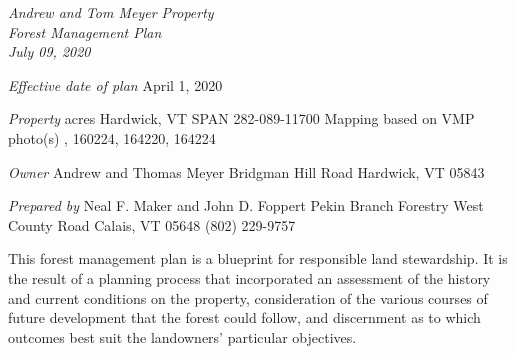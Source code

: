 \documentclass[]{tufte-handout}
\date{}
\begin{document}
\thispagestyle{empty}

\noindent\LARGE \emph{Andrew and Tom Meyer Property}\\
\noindent\Large \emph{Forest Management Plan}\\
\noindent\Large \emph{July 09, 2020}

\normalsize 

\begin{marginfigure}
\hspace{2pt}\newline\vspace{80pt}
\noindent \textit{\large Effective date of plan}  
\newline\indent April 1, 2020  
\end{marginfigure}

\begin{marginfigure}
\noindent \textit{\large Property}   
\newline{} acres    
\newline\indent Hardwick, VT  
\newline\indent SPAN 282-089-11700  
\newline\indent Mapping based on VMP photo(s)  
\newline{}, 160224, 164220, 164224  
\end{marginfigure}

\begin{marginfigure}
\noindent \textit{\large Owner}
\newline\indent Andrew and Thomas Meyer  
\newline{} Bridgman Hill Road
\indent 
\newline\indent Hardwick, VT 05843  
\end{marginfigure}

\begin{marginfigure}
\noindent \textit{\large Prepared by} 
\newline\indent Neal F. Maker and John D. Foppert  
\newline\indent Pekin Branch Forestry  
\newline{} West County Road  
\newline\indent Calais, VT 05648  
\newline\indent (802) 229-9757  
\vspace{100pt}\end{marginfigure}

\vspace{30pt} \indent This forest management plan is a blueprint for
responsible land stewardship. It is the result of a planning process
that incorporated an assessment of the history and current conditions on
the property, consideration of the various courses of future development
that the forest could follow, and discernment as to which outcomes best
suit the landowners' particular objectives.
\end{document}
